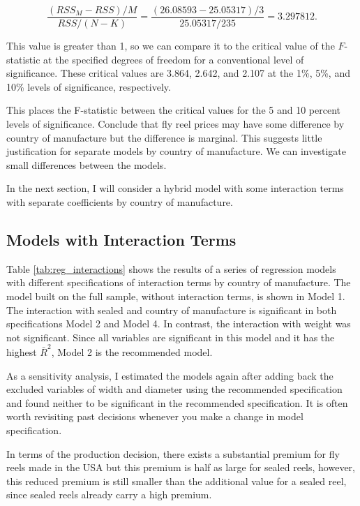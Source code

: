 \documentclass[11pt]{paper}
\begin{document}
$$ 
\frac{(RSS_M - RSS)/M}{RSS/(N - K)} = \frac{(26.08593 - 25.05317)/3}{25.05317/235} = 3.297812. 
$$

This value is greater than 1, so we can compare it to the critical value
of the $F$-statistic at the specified degrees of freedom for
a conventional level of significance.
These critical values are 
3.864, 2.642, and 2.107
at the 1\%, 5\%, and 10\%
levels of significance, respectively.

This places the F-statistic between the critical values for the
5 and 10 percent levels of significance.
Conclude that fly reel prices may have some difference by
country of manufacture but the difference is marginal.
This suggests little justification for separate models by
country of manufacture.
We can investigate small differences between the models.


In the next section, 
I will consider a hybrid model with some interaction terms
with separate coefficients by country of manufacture. 


\subsection{Models with Interaction Terms}

Table \ref{tab:reg_interactions} shows the results of 
a series of regression models with different 
specifications of interaction terms by country of manufacture. 
% 
The model built on the full sample, without interaction terms, 
is shown in Model 1. 
%
The interaction with sealed and country of manufacture is significant in both specifications Model 2 and Model 4.
In contrast, the interaction with weight was not significant. 
%
Since all variables are significant in this model and it
has the highest $\bar{R}^2$, Model 2 is the recommended model.

As a sensitivity analysis, 
I estimated the models again after adding back the excluded variables of width and diameter using the recommended specification
and found neither to be significant in 
the recommended specification. 
It is often worth revisiting past decisions whenever you make 
a change in model specification. 




In terms of the production decision, 
there exists a substantial premium for fly reels made in the USA
but this premium is half as large for sealed reels, 
however, this reduced premium is still smaller than the 
additional value for a sealed reel, 
since sealed reels already carry a high premium.  


\end{document}
